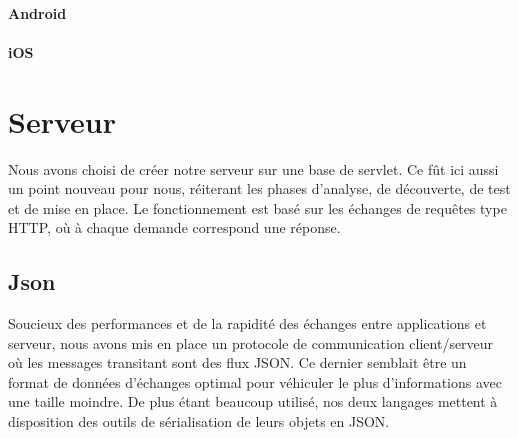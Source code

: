 \documentclass[a4paper,11pt]{report}
\begin{document}
				\paragraph{Android}
				\paragraph{iOS}
		
	\section{Serveur}
		Nous avons choisi de créer notre serveur sur une base de servlet. Ce fût ici
		aussi un point nouveau pour nous, réiterant les phases d'analyse, de
		découverte, de test et de mise en place. Le fonctionnement est basé sur les
		échanges de requêtes type HTTP, où à chaque demande correspond une réponse. 
		
		\subsection{Json}
		Soucieux des performances et de la rapidité des échanges entre applications et
		serveur, nous avons mis en place un protocole de communication client/serveur
		où les messages transitant sont des flux JSON. Ce dernier semblait être un
		format de données d'échanges optimal pour véhiculer le plus d'informations
		avec une taille moindre. De plus étant beaucoup utilisé, nos deux langages
		mettent à disposition des outils de sérialisation de leurs objets en JSON.
		
\end{document}
